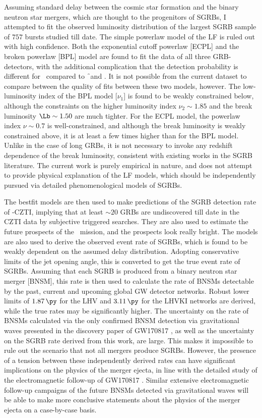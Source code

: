 Assuming standard delay between the cosmic star formation and the binary neutron star mergers, which are thought to the progenitors of SGRBs, I attempted to fit the observed luminosity distribution of the largest SGRB sample of $757$ bursts studied till date. The simple powerlaw model of the LF is ruled out with high confidence. Both the exponential cutoff powerlaw [ECPL] and the broken powerlaw [BPL] model are found to fit the data of all three GRB-detectors, with the additional complication that the detection probability is different for \B\ compared to \f\ and \s. It is not possible from the current dataset to compare between the quality of fits between these two models, however. The low-luminosity index of the BPL model [$\nu_1$] is found to be weakly constrained below, although the constraints on the higher luminosity index $\nu_2 \sim 1.85$ and the break luminosity $\Lb \sim 1.50$ are much tighter. For the ECPL model, the powerlaw index $\nu \sim 0.7$ is well-constrained, and although the break luminosity is weakly constrained above, it is at least a few times higher than for the BPL model. Unlike in the case of long GRBs, it is not necessary to invoke any redshift dependence of the break luminosity, consistent with existing works in the SGRB literature. The current work is purely empirical in nature, and does not attempt to provide physical explanation of the LF models, which should be independently pursued via detailed phenomenological models of SGRBs.

The bestfit models are then used to make predictions of the SGRB detection rate of \AS -CZTI, implying that at least $\sim 20$ GRBs are undiscovered till date in the CZTI data by subjective triggered searches. They are also used to estimate the future prospects of the \D\ mission, and the prospects look really bright. The models are also used to derive the observed event rate of SGRBs, which is found to be weakly dependent on the assumed delay distribution. Adopting conservative limits of the jet opening angle, this is converted to get the true event rate of SGRBs. Assuming that each SGRB is produced from a binary neutron star merger [BNSM], this rate is then used to calculate the rate of BNSMs detectable by the past, current and upcoming global GW detector networks. Robust lower limits of $1.87 \, \py$ for the LHV and $3.11 \, \py$ for the LHVKI networks are derived, while the true rates may be significantly higher. The uncertainty on the rate of BNSMs calculated via the only confirmed BNSM detection via gravitational waves presented in the discovery paper of GW170817 \citep{GW170817-2017}, as well as the uncertainty on the SGRB rate derived from this work, are large. This makes it impossible to rule out the scenario that not all mergers produce SGRBs. However, the presence of a tension between these independently derived rates can have significant implications on the physics of the merger ejecta, in line with the detailed study of the electromagnetic follow-up of GW170817 \citep{Kasliwal_et_al.-2017-Science}. Similar extensive electromagnetic follow-up campaigns of the future BNSMs detected via gravitational waves will be able to make more conclusive statements about the physics of the merger ejecta on a case-by-case basis.
